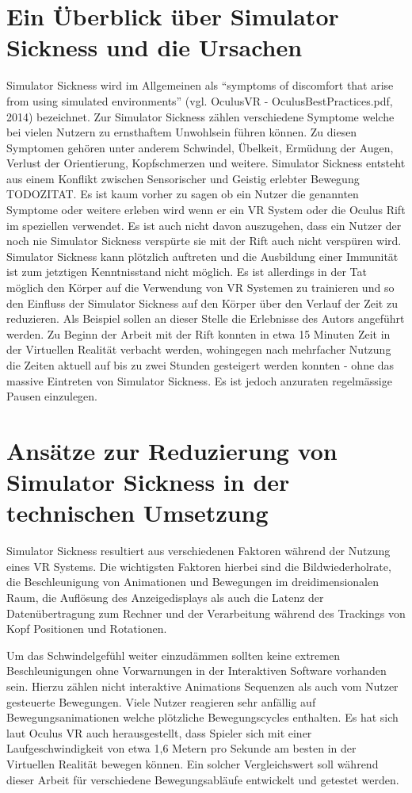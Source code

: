 \documentclass[pagesize, paper=a4, fontsize=12pt,titlepage=true, headings=small, headnosepline, abstractoff, liststotoc, nochapterprefix, plainheadsepline]{scrreprt}
\begin{document}
\section{Ein Überblick über Simulator Sickness und die Ursachen}
Simulator Sickness wird im Allgemeinen als "`symptoms of discomfort that arise from using simulated environments"' (vgl. OculusVR - OculusBestPractices.pdf, 2014) bezeichnet.
Zur Simulator Sickness zählen verschiedene Symptome welche bei vielen Nutzern zu ernsthaftem Unwohlsein führen können. Zu diesen Symptomen gehören unter anderem Schwindel, Übelkeit, Ermüdung der Augen, Verlust der Orientierung, Kopfschmerzen und weitere. Simulator Sickness entsteht aus einem Konflikt zwischen Sensorischer und Geistig erlebter Bewegung TODOZITAT. Es ist kaum vorher zu sagen ob ein Nutzer die genannten Symptome oder weitere erleben wird wenn er ein VR System oder die Oculus Rift im speziellen verwendet. Es ist auch nicht davon auszugehen, dass ein Nutzer der noch nie Simulator Sickness verspürte sie mit der Rift auch nicht verspüren wird. Simulator Sickness kann plötzlich auftreten und die Ausbildung einer Immunität ist zum jetztigen Kenntnisstand nicht möglich. Es ist allerdings in der Tat möglich den Körper auf die Verwendung von VR Systemen zu trainieren und so den Einfluss der Simulator Sickness auf den Körper über den Verlauf der Zeit zu reduzieren. Als Beispiel sollen an dieser Stelle die Erlebnisse des Autors angeführt werden. Zu Beginn der Arbeit mit der Rift konnten in etwa 15 Minuten Zeit in der Virtuellen Realität verbacht werden, wohingegen nach mehrfacher Nutzung die Zeiten aktuell auf bis zu zwei Stunden gesteigert werden konnten - ohne das massive  Eintreten von Simulator Sickness. Es ist jedoch anzuraten regelmässige Pausen einzulegen.

\section{Ansätze zur Reduzierung von Simulator Sickness in der technischen Umsetzung}
Simulator Sickness resultiert aus verschiedenen Faktoren während der Nutzung eines VR Systems. Die wichtigsten Faktoren hierbei sind die Bildwiederholrate, die Beschleunigung von Animationen und Bewegungen im dreidimensionalen Raum, die Auflösung des Anzeigedisplays als auch die Latenz der Datenübertragung zum Rechner und der Verarbeitung während des Trackings von Kopf Positionen und Rotationen. 

Um das Schwindelgefühl weiter einzudämmen sollten keine extremen Beschleunigungen ohne Vorwarnungen in der Interaktiven Software vorhanden sein. Hierzu zählen nicht interaktive Animations Sequenzen als auch vom Nutzer gesteuerte Bewegungen. Viele Nutzer reagieren sehr anfällig auf Bewegungsanimationen welche plötzliche Bewegungscycles enthalten. Es hat sich laut Oculus VR auch herausgestellt, dass Spieler sich mit einer Laufgeschwindigkeit von etwa 1,6 Metern pro Sekunde am besten in der Virtuellen Realität bewegen können. Ein solcher Vergleichswert soll während dieser Arbeit für verschiedene Bewegungsabläufe entwickelt und getestet werden.
\end{document}
